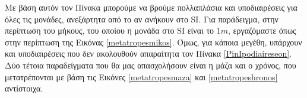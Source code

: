 \noindent \begin{minipage}{0.6\textwidth}
\vspace{1cm}
%
\label{metatropesmikos}
\end{minipage}
\hspace{0.05\textwidth}
\begin{minipage}{0.35\textwidth}
Με βάση αυτόν τον Πίνακα μπορούμε να βρούμε πολλαπλάσια και υποδιαιρέσεις για όλες τις μονάδες, ανεξάρτητα από το αν ανήκουν στο SI. Για παράδειγμα, στην περίπτωση του μήκους, του οποίου η μονάδα στο SI είναι το $1 m$, εργαζόμαστε όπως στην περίπτωση της Eικόνας \ref{metatropesmikos}. Όμως, για κάποια μεγέθη, υπάρχουν και υποδιαιρέσεις που δεν ακολουθούν απαραίτητα τον Πίνακα \ref{PinIpodiaireseon}.  Δύο τέτοια παραδείγματα που θα μας απασχολήσουν είναι η μάζα και ο χρόνος, που μετατρέπονται με βάση τις Εικόνες \ref{metatropesmaza} και \ref{metatropeshronos} αντίστοιχα.
\end{minipage}

